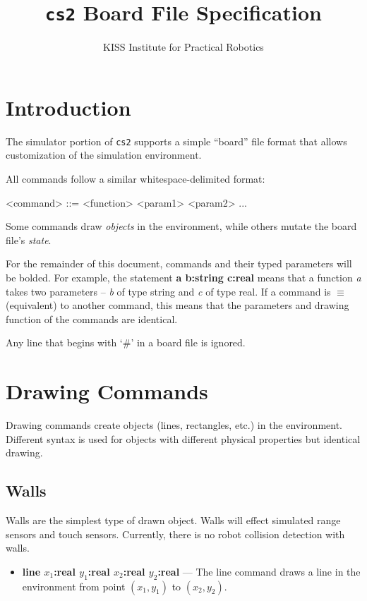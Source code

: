 \documentclass{article}
\begin{document}
  \title{\texttt{cs2} Board File Specification}
  \author{KISS Institute for Practical Robotics}
  \maketitle
  
  
  \section{Introduction}
  The simulator portion of \texttt{cs2} supports a simple ``board'' file format
  that allows customization of the simulation environment.
  
  All commands follow a similar whitespace-delimited format:
  
  \begin{grammar}
    <command> ::= <function> <param1> <param2> ...
  \end{grammar}
  
  Some commands draw \emph{objects} in the environment, while
  others mutate the board file's \emph{state}.
  
  For the remainder of this document, commands and their typed parameters will be bolded. For example, the statement \textbf{a b:string c:real} means that a function \emph{a} takes two parameters -- \emph{b} of type string and \emph{c} of type real.
  If a command is $ \equiv $ (equivalent) to another command,
  this means that the parameters and drawing function of the
  commands are identical.
  
  Any line that begins with `\#' in a board file is ignored.
  
  \section{Drawing Commands}
  
  Drawing commands create objects (lines, rectangles, etc.) in the environment. Different syntax is used for objects with different physical properties but identical drawing.
  
  \subsection{Walls}
  
  Walls are the simplest type of drawn object. Walls will
  effect simulated range sensors and touch sensors.
  Currently, there is no robot collision detection with walls.
  
  \begin{itemize}
    \item \textbf{line $x_1$:real $y_1$:real $x_2$:real $y_2$:real} --- The line command draws a line in the environment
    from point $(x_1, y_1)$ to $(x_2, y_2)$.
  \end{itemize}
  
\end{document}
